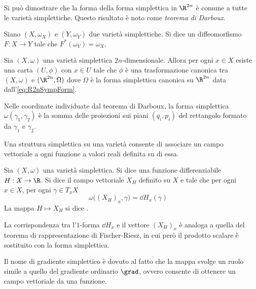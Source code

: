 Si può dimostrare che la forma della forma simplettica in $\R^{2n}$ è comune a tutte le varietà simplettiche. Questo risultato è noto come \emph{teorema di Darboux}.

\begin{definition}
  Siano $(X, \omega_X)$ e $(Y, \omega_Y)$ due varietà simplettiche. Si dice  un diffeomorfismo $F:X\to Y$ tale che $F^*(\omega_Y) = \omega_X$. 
\end{definition}
\begin{theorem}[Darboux]
  Sia $(X,\omega)$ una varietà simplettica $2n$-dimensionale. Allora per ogni $x \in X$ esiste una carta $(U,\phi)$ con $x \in U$ tale che $\phi$ è una trasformazione canonica tra $(X,\omega)$ e $(\R^{2n}, \Omega)$ dove $\Omega$ è la forma simplettica canonica su $\R^{2n}$ data dall'\autoref{eq:R2nSympForm}.
\end{theorem}
\begin{remark}
  Nelle coordinate individuate dal teorema di Darboux, la forma simplettica $\omega(\gamma_1,\gamma_2)$ è la somma delle proiezioni sui piani $(q_i, p_i)$ del rettangolo formato da $\gamma_1$ e $\gamma_2$.
\end{remark}

Una struttura simplettica su una varietà consente di associare un campo vettoriale a ogni funzione a valori reali definita su di essa. 
\begin{definition} \label{def:hamField}
  Sia $(X, \omega)$ una varietà simplettica. Si dice  una funzione differenziabile $H: X \to \R$. Si dice  il campo vettoriale $X_H$ definito su $X$ e tale che per ogni $x \in X$, per ogni $\gamma \in T_x X$
  \begin{equation} \label{eq:hamField}
    \omega\big((X_H)_x, \gamma\big) = \dd{H}_x(\gamma)
  \end{equation}
  La mappa $H \mapsto X_H$ si dice .
\end{definition}
\begin{remark}
  La corrispondenza tra l'$1$-forma $\dd{H}_x$ e il vettore $(X_H)_x$ è analoga a quella del teorema di rappresentazione di Fischer-Riesz, in cui però il prodotto scalare è sostituito con la forma simplettica.
\end{remark}
\begin{remark}
  Il nome di gradiente simplettico è dovuto al fatto che la mappa svolge un ruolo simile a quello del gradiente ordinario $\grad$, ovvero consente di ottenere un campo vettoriale da una funzione.
\end{remark}

